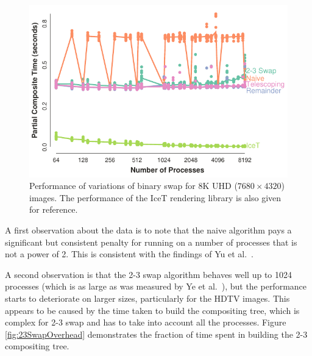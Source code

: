 \documentclass{vgtc}                          %
\newcommand*{\scite}[1]{~\cite{#1}}
\newcommand{\textalgorithm}[1]{\textsf{#1}\xspace}
\newcommand{\binaryswap}{\textalgorithm{binary swap}}
\newcommand{\ttswap}{\textalgorithm{2-3 swap}}
\begin{document}
\begin{figure}
  \centering
  \includegraphics[width=\linewidth]{scaling-8k}
  \caption{
    Performance of variations of \binaryswap for 8K UHD ($7680 \times 4320$) images.
    The performance of the IceT rendering library is also given for reference.
  }
  \label{fig:Scaling8K}
\end{figure}

A first observation about the data is to note that the naive algorithm pays a significant but consistent penalty for running on a number of processes that is not a power of 2.
This is consistent with the findings of Yu et al.\scite{23Swap}.

A second observation is that the \ttswap algorithm behaves well up to 1024 processes (which is as large as was measured by Ye et al.\scite{23Swap}), but the performance starts to deteriorate on larger sizes, particularly for the HDTV images.
This appears to be caused by the time taken to build the compositing tree, which is complex for \ttswap and has to take into account all the processes.
Figure \ref{fig:23SwapOverhead} demonstrates the fraction of time spent in building the 2-3 compositing tree.
\end{document}
